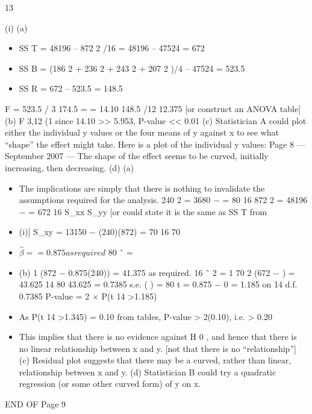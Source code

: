 \documentclass[a4paper,12pt]{article}
\begin{document}

13
\item (i)
(a)
\begin{itemize}
\item SS T = 48196 – 872 2 /16 = 48196 – 47524 = 672
\item SS B = (186 2 + 236 2 + 243 2 + 207 2 )/4 – 47524 = 523.5
\item SS R = 672 – 523.5 = 148.5
\end{itemize} 
F =
523.5 / 3 174.5
=
= 14.10
148.5 /12 12.375
[or construct an ANOVA table]
(b)
F 3,12 (1%
since 14.10 >> 5.953, P-value << 0.01
(c)
Statistician A could plot either the individual y values or the four
means of y against x to see what “shape” the effect might take.
Here is a plot of the individual y values:
Page 8  — September 2007 — %
The shape of the effect seems to be curved, initially increasing, then
decreasing.
(d)
(a)
\begin{itemize}
\item The implications are simply that there is nothing to invalidate the
assumptions required for the analysis.
240 2
= 3680 −
= 80
16
872 2
= 48196 −
= 672
16
S_{xx}
S_{yy}
[or could state it is the same as SS T from \item (i)]
S_{xy} = 13150 −
(240)(872)
= 70
16
70
\item $\hat{\beta} = = 0.875 as required$
80
\alpha ˆ =

\item (b)
1
(872 − 0.875(240)) = 41.375 as required.
16
\sum ˆ 2 =
1
70 2
(672 −
) = 43.625
14
80
43.625
= 0.7385
s.e. (  ) =
80
t =
0.875 − 0
= 1.185 on 14 d.f.
0.7385
P-value = 2 × P(t 14 >1.185)
\item As P(t 14 >1.345) = 0.10 from tables, P-value > 2(0.10), i.e. > 0.20
\item This implies that there is no evidence against H 0 , and hence that there
is no linear relationship between x and y.
[not that there is no “relationship”]
(c) Residual plot suggests that there may be a curved, rather than linear,
relationship between x and y.
(d) Statistician B could try a quadratic regression (or some other curved
form) of y on x.
\end{itemize}
END OF %
Page 9
\end{document}
